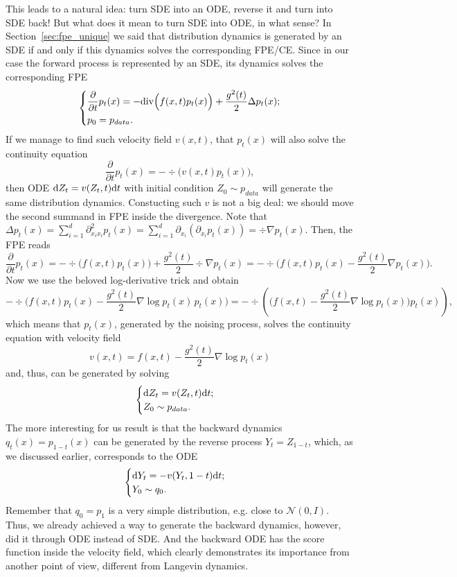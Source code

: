 This leads to a natural idea: turn SDE into an ODE, reverse it and turn into SDE back! But what does it mean to turn SDE into ODE, in what sense? In Section~\ref{sec:fpe_unique} we said that distribution dynamics is generated by an SDE if and only if this dynamics solves the corresponding FPE/CE. Since in our case the forward process is represented by an SDE, its dynamics solves the corresponding FPE
\[
    \begin{dcases}
        \frac{\partial}{\partial t} p_t(x) = -\div\Big(f(x, t)p_t(x)\Big) + \frac{g^2(t)}{2} \Delta p_t(x);\\
        p_0 = p_{data}.
    \end{dcases}
\]
If we manage to find such velocity field $v(x, t)$, that $p_t(x)$ will also solve the continuity equation 
\[
    \frac{\partial}{\partial t} p_t(x) = -\div \Big(v(x, t)p_t(x)\Big),
\]
then ODE $\rmd Z_t = v(Z_t, t)\rmd t$ with initial condition $Z_0 \sim p_{data}$ will generate the same distribution dynamics. Constucting such $v$ is not a big deal: we should move the second summand in FPE inside the divergence. Note that $\Delta p_t(x) = \sum_{i = 1}^{d}\partial^2_{x_i x_i} p_t(x) = \sum_{i = 1}^{d} \partial_{x_i}(\partial_{x_i} p_t(x)) = \div \nabla p_t(x)$. Then, the FPE reads
\[
    \frac{\partial}{\partial t} p_t(x) = -\div\Big(f(x, t)p_t(x)\Big) + \frac{g^2(t)}{2} \div \nabla p_t(x) = -\div\Big(f(x, t)p_t(x) - \frac{g^2(t)}{2} \nabla p_t(x) \Big).
\]
Now we use the beloved log-derivative trick and obtain
\[
    -\div\Big(f(x, t)p_t(x) - \frac{g^2(t)}{2}\nabla \log p_t(x) \, p_t(x)\Big) = -\div\left(\Big(f(x, t) - \frac{g^2(t)}{2} \nabla \log p_t(x)\Big)p_t(x)\right),
\]
which means that $p_t(x)$, generated by the noising process, solves the continuity equation with velocity field
\[
    v(x, t) = f(x, t) - \frac{g^2(t)}{2} \nabla \log p_t(x)
\]
and, thus, can be generated by solving
\[
    \begin{cases}
        \rmd Z_t = v(Z_t, t) \rmd t;\\
        Z_0 \sim p_{data}.
    \end{cases}
\]
The more interesting for us result is that the backward dynamics $q_t(x) = p_{1 - t}(x)$ can be generated by the reverse process $Y_t = Z_{1 - t}$, which, as we discussed earlier, corresponds to the ODE
\[
    \begin{cases}
        \rmd Y_t = -v(Y_t, 1 - t)\rmd t;\\
        Y_0 \sim q_0.
    \end{cases}
\]
Remember that $q_0 = p_1$ is a very simple distribution, e.g. close to $\mathcal{N}(0, I)$. Thus, we already achieved a way to generate the backward dynamics, however, did it through ODE instead of SDE. And the backward ODE has the score function inside the velocity field, which clearly demonstrates its importance from another point of view, different from Langevin dynamics. 

